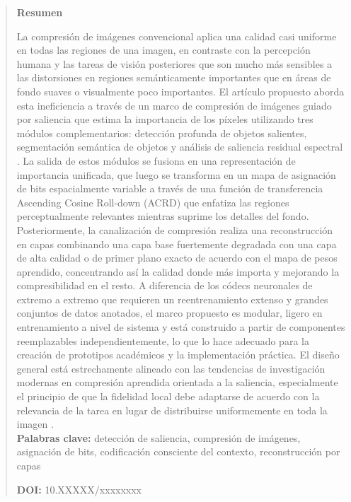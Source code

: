 \documentclass[11pt,                                                             
 superscriptaddress,twoside,
 amsmath,amssymb,
 aps, physrev
]{revtex4-2}
\begin{document}
\begin{abstract}
{%
\centerline{{\bf Resumen}} 
La compresión de imágenes convencional aplica una calidad casi uniforme en todas las regiones de una imagen, en contraste con la percepción humana y las tareas de visión posteriores que son mucho más sensibles a las distorsiones en regiones semánticamente importantes que en áreas de fondo suaves o visualmente poco importantes. El artículo propuesto aborda esta ineficiencia a través de un marco de compresión de imágenes guiado por saliencia que estima la importancia de los píxeles utilizando tres módulos complementarios: detección profunda de objetos salientes, segmentación semántica de objetos y análisis de saliencia residual espectral \cite{hou2007ieee}. La salida de estos módulos se fusiona en una representación de importancia unificada, que luego se transforma en un mapa de asignación de bits espacialmente variable a través de una función de transferencia Ascending Cosine Roll-down (ACRD) que enfatiza las regiones perceptualmente relevantes mientras suprime los detalles del fondo. Posteriormente, la canalización de compresión realiza una reconstrucción en capas combinando una capa base fuertemente degradada con una capa de alta calidad o de primer plano exacto de acuerdo con el mapa de pesos aprendido, concentrando así la calidad donde más importa y mejorando la compresibilidad en el resto. A diferencia de los códecs neuronales de extremo a extremo que requieren un reentrenamiento extenso y grandes conjuntos de datos anotados, el marco propuesto es modular, ligero en entrenamiento a nivel de sistema y está construido a partir de componentes reemplazables independientemente, lo que lo hace adecuado para la creación de prototipos académicos y la implementación práctica. El diseño general está estrechamente alineado con las tendencias de investigación modernas en compresión aprendida orientada a la saliencia, especialmente el principio de que la fidelidad local debe adaptarse de acuerdo con la relevancia de la tarea en lugar de distribuirse uniformemente en toda la imagen \cite{li2024ieee}. \\ 
\textbf{Palabras clave:} detección de saliencia, compresión de imágenes, asignación de bits, codificación consciente del contexto, reconstrucción por capas

{\textbf{DOI:} 10.XXXXX/xxxxxxxx} %
\par}
\end{abstract}
\maketitle
\thispagestyle{portada}
\end{document}
